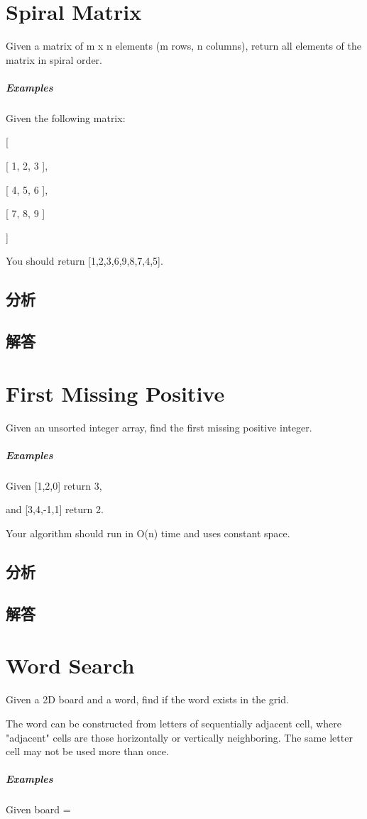 \documentclass[UTF8,a4paper,12pt]{ctexbook}
\begin{document}
	
\section{Spiral Matrix}
		Given a matrix of m x n elements (m rows, n columns), return all elements of the matrix in spiral order.
	\subparagraph{Examples}
		Given the following matrix:
		
		[
		
		[ 1, 2, 3 ],
		
		[ 4, 5, 6 ],
		
		[ 7, 8, 9 ]
		
		]
		
		You should return [1,2,3,6,9,8,7,4,5].
	\subsection{分析}
	
	\subsection{解答}
	
	
\section{First Missing Positive}
		Given an unsorted integer array, find the first missing positive integer.
	\subparagraph{Examples}
		Given [1,2,0] return 3,
		
		and [3,4,-1,1] return 2.
		
		Your algorithm should run in O(n) time and uses constant space.
	\subsection{分析}
	
	\subsection{解答}
	
	
\section{Word Search}
		Given a 2D board and a word, find if the word exists in the grid.
		
		The word can be constructed from letters of sequentially adjacent cell, where "adjacent" cells are those horizontally or vertically neighboring. The same letter cell may not be used more than once.
	\subparagraph{Examples}
		Given board =
		
\end{document}
